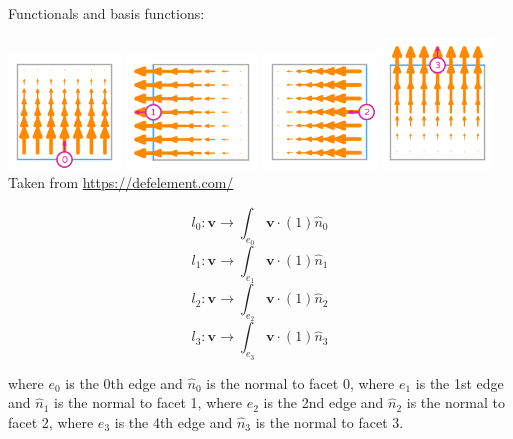 Functionals and basis functions:

\begin{center}
\includegraphics[width=3cm]{images/pair_raviart-thomas/element-NCF-variant-equispaced-quadrilateral-1-0}
\includegraphics[width=3.5cm]{images/pair_raviart-thomas/element-NCF-variant-equispaced-quadrilateral-1-1}
\includegraphics[width=3cm]{images/pair_raviart-thomas/element-NCF-variant-equispaced-quadrilateral-1-2}
\includegraphics[width=3cm]{images/pair_raviart-thomas/element-NCF-variant-equispaced-quadrilateral-1-3}\\
{\captionfont Taken from \url{https://defelement.com/}}
\end{center}


\[
l_0: {\bm v} \rightarrow \int_{e_0} {\bm v} \cdot (1) \hat{n}_0
\]
\[
l_1: {\bm v} \rightarrow \int_{e_1} {\bm v} \cdot (1) \hat{n}_1
\]
\[
l_2: {\bm v} \rightarrow \int_{e_2} {\bm v} \cdot (1) \hat{n}_2
\]
\[
l_3: {\bm v} \rightarrow \int_{e_3} {\bm v} \cdot (1) \hat{n}_3
\]


where $e_0$ is the 0th edge and $\hat{n}_0$ is the normal to facet 0,
where $e_1$ is the 1st edge and $\hat{n}_1$ is the normal to facet 1,
where $e_2$ is the 2nd edge and $\hat{n}_2$ is the normal to facet 2,
where $e_3$ is the 4th edge and $\hat{n}_3$ is the normal to facet 3.


